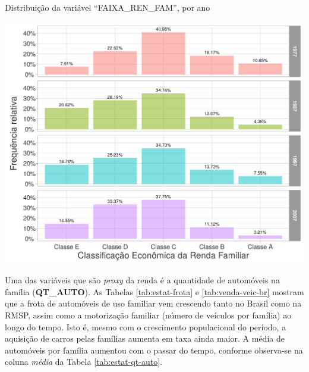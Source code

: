 \begin{grafico}[htb]%
    \caption{\label{graf:class-econ-ren-fam}Distribuição da variável ``FAIXA_REN_FAM'', por ano}%
    \begin{center}%
        \includegraphics[width=1\textwidth]{./imagens/class-econ-ren-fam.png}%
    \end{center}%
\end{grafico}%

\newpage

Uma das variáveis que são \textit{proxy} da renda é a quantidade de automóveis na família (\textbf{QT_AUTO}).
As Tabelas \ref{tab:estat-frota} e \ref{tab:venda-veic-br} mostram que a frota de automóveis de uso familiar vem crescendo tanto no Brasil como na RMSP, assim como a motorização familiar (número de veículos por família) ao longo do tempo. Isto é, mesmo com o crescimento populacional do período, a aquisição de carros pelas famílias aumenta em taxa ainda maior.
A média de automóveis por família aumentou com o passar do tempo, conforme observa-se na coluna \textit{média} da Tabela \ref{tab:estat-qt-auto}.

